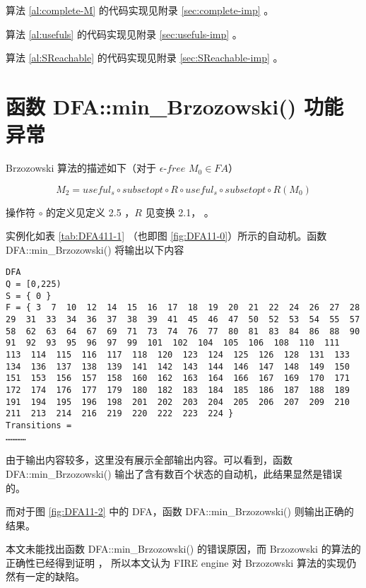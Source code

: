 算法 \ref{al:complete-M} 的代码实现见附录 \ref{sec:complete-imp} 。

算法 \ref{al:usefuls} 的代码实现见附录 \ref{sec:usefuls-imp} 。

算法 \ref{al:SReachable} 的代码实现见附录 \ref{sec:SReachable-imp} 。



\section{函数 DFA::min\_Brzozowski() 功能异常}

Brzozowski 算法的描述如下\cite{watson1993taxonomyb}（对于 $\epsilon$-$free$ $M_0 \in FA$）

\[ M_2 = useful_s \circ subsetopt \circ R \circ useful_s \circ subsetopt \circ R(M_0) \] 

操作符 $\circ$ 的定义见定义 2.5 ，$R$ 见变换 2.1， 。

实例化如表 \ref{tab:DFA411-1} （也即图 \ref{fig:DFA11-0}）所示的自动机。函数 DFA::min\_Brzozowski() 将输出以下内容

\begin{lstlisting}
DFA
Q = [0,225)
S = { 0 }
F = { 3  7  10  12  14  15  16  17  18  19  20  21  22  24  26  27  28  29  31  33  34  36  37  38  39  41  45  46  47  50  52  53  54  55  57  58  62  63  64  67  69  71  73  74  76  77  80  81  83  84  86  88  90  91  92  93  95  96  97  99  101  102  104  105  106  108  110  111  113  114  115  116  117  118  120  123  124  125  126  128  131  133  134  136  137  138  139  141  142  143  144  146  147  148  149  150  151  153  156  157  158  160  162  163  164  166  167  169  170  171  172  174  176  177  179  180  182  183  184  185  186  187  188  189  191  194  195  196  198  201  202  203  204  205  206  207  209  210  211  213  214  216  219  220  222  223  224 }
Transitions =
…………
\end{lstlisting}

由于输出内容较多，这里没有展示全部输出内容。可以看到，函数 DFA::min\_Brzozowski() 输出了含有数百个状态的自动机，此结果显然是错误的。

而对于图 \ref{fig:DFA11-2} 中的 DFA，函数 DFA::min\_Brzozowski() 则输出正确的结果。

本文未能找出函数 DFA::min\_Brzozowski() 的错误原因，而 Brzozowski 的算法的正确性已经得到证明\cite{watson1993taxonomyb} ， 所以本文认为 FIRE engine 对 Brzozowski 算法的实现仍然有一定的缺陷。




